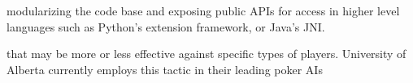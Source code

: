  modularizing the code base and exposing public APIs for access in higher level languages such as Python's extension framework, or Java's JNI.

 that may be more or less effective against specific types of players. University of Alberta currently employs this tactic in their leading poker AIs~\cite{PolarisCoached2007}
 
 
